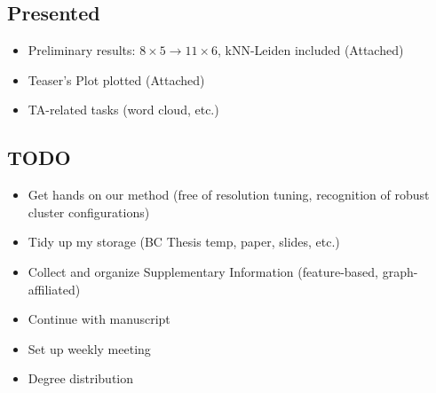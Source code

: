 
\begin{multicols}{2}
\subsection*{Presented}
\begin{itemize}[label=\textbullet]
    \item Preliminary results: $8 \times 5 \rightarrow 11 \times 6$, kNN-Leiden included (Attached)
    \item Teaser’s Plot plotted (Attached)
    \item TA-related tasks (word cloud, etc.)
\end{itemize}

\columnbreak %

\subsection*{TODO}
\begin{itemize}[label=\textbullet]
    \item Get hands on our method (free of resolution tuning, recognition of robust cluster configurations)
    \item Tidy up my storage (BC Thesis temp, paper, slides, etc.)
    \item Collect and organize Supplementary Information (feature-based, graph-affiliated)
    \item Continue with manuscript
    \item Set up weekly meeting
    \item Degree distribution
\end{itemize}
\end{multicols}

\newpage